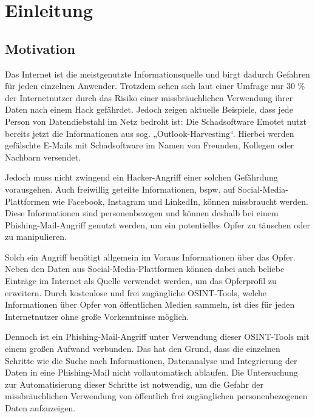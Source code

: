 \chapter{Einleitung}
\label{cha:einleitung}

\section{Motivation}
Das Internet ist die meistgenutzte Informationsquelle und birgt dadurch Gefahren für jeden einzelnen Anwender.  \cite{Inforamtionsquellen} Trotzdem sehen sich laut einer Umfrage nur 30 \% der Internetnutzer durch das Risiko einer missbräuchlichen Verwendung ihrer Daten nach einem Hack gefährdet. \cite{AngstDatendiebstahl} Jedoch zeigen aktuelle Beispiele, dass jede Person von Datendiebstahl im Netz bedroht ist: Die Schadsoftware Emotet nutzt bereits jetzt die Informationen aus sog. „Outlook-Harvesting“. Hierbei werden gefälschte E-Mails mit Schadsoftware im Namen von Freunden, Kollegen oder Nachbarn versendet. \cite{bsiEmotet}

Jedoch muss nicht zwingend ein Hacker-Angriff einer solchen Gefährdung vorausgehen. Auch freiwillig geteilte Informationen, bspw. auf Social-Media-Plattformen wie Facebook, Instagram und LinkedIn, können missbraucht werden. Diese Informationen sind personenbezogen und können deshalb bei einem Phishing-Mail-Angriff genutzt werden, um ein potentielles Opfer zu täuschen oder zu manipulieren.

Solch ein Angriff benötigt allgemein im Voraus Informationen über das Opfer.  Neben den Daten aus Social-Media-Plattformen können dabei auch beliebe Einträge im Internet als Quelle verwendet werden, um das Opferprofil zu erweitern. Durch kostenlose und frei zugängliche OSINT-Tools, welche Informationen über Opfer von öffentlichen Medien sammeln, ist dies für jeden Internetnutzer ohne große Vorkenntnisse möglich. 

Dennoch ist ein Phishing-Mail-Angriff unter Verwendung dieser OSINT-Tools mit einem großen Aufwand verbunden. Das hat den Grund, dass die einzelnen Schritte wie die Suche nach Informationen, Datenanalyse und Integrierung der Daten in eine Phishing-Mail nicht vollautomatisch ablaufen. Die Untersuchung zur Automatisierung dieser Schritte ist notwendig, um die Gefahr der missbräuchlichen Verwendung von öffentlich frei zugänglichen personenbezogenen Daten aufzuzeigen.

